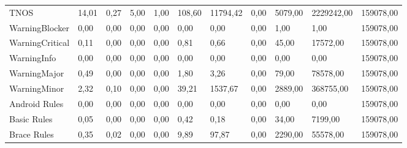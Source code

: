 \begin{table}[H]
{\begin{tabular}{@{}lp{10mm}p{10mm}p{10mm}p{10mm}llllll@{}}
TNOS                                & 14,01          & 0,27                    & 5,00             & 1,00          & 108,60                         & 11794,42                          & 0,00            & 5079,00         & 2229242,00     & 159078,00       \\
WarningBlocker                      & 0,00           & 0,00                    & 0,00             & 0,00          & 0,00                           & 0,00                              & 0,00            & 1,00            & 1,00           & 159078,00       \\
WarningCritical                     & 0,11           & 0,00                    & 0,00             & 0,00          & 0,81                           & 0,66                              & 0,00            & 45,00           & 17572,00       & 159078,00       \\
WarningInfo                         & 0,00           & 0,00                    & 0,00             & 0,00          & 0,00                           & 0,00                              & 0,00            & 0,00            & 0,00           & 159078,00       \\
WarningMajor                        & 0,49           & 0,00                    & 0,00             & 0,00          & 1,80                           & 3,26                              & 0,00            & 79,00           & 78578,00       & 159078,00       \\
WarningMinor                        & 2,32           & 0,10                    & 0,00             & 0,00          & 39,21                          & 1537,67                           & 0,00            & 2889,00         & 368755,00      & 159078,00       \\
Android Rules                       & 0,00           & 0,00                    & 0,00             & 0,00          & 0,00                           & 0,00                              & 0,00            & 0,00            & 0,00           & 159078,00       \\
Basic Rules                         & 0,05           & 0,00                    & 0,00             & 0,00          & 0,42                           & 0,18                              & 0,00            & 34,00           & 7199,00        & 159078,00       \\
Brace Rules                         & 0,35           & 0,02                    & 0,00             & 0,00          & 9,89                           & 97,87                             & 0,00            & 2290,00         & 55578,00       & 159078,00       \\

\end{tabular}}
\end{table}
